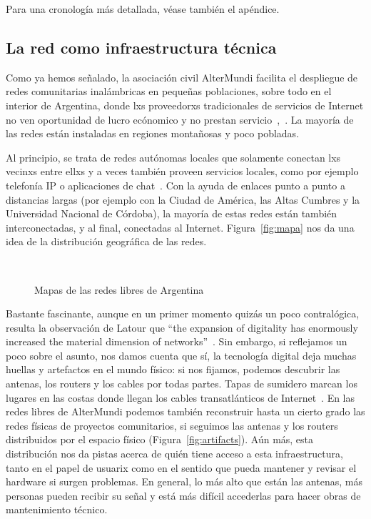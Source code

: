Para una cronología más detallada, véase también el apéndice.

\subsection{La red como infraestructura técnica}

Como ya hemos señalado, la asociación civil AlterMundi facilita el despliegue de redes comunitarias inalámbricas en pequeñas poblaciones, sobre todo en el interior de Argentina, donde lxs proveedorxs tradicionales de servicios de Internet no ven oportunidad de lucro ecónomico y no prestan servicio~\autocite{Piccoli2015},~\autocite{Vaseva2016a}.
La mayoría de las redes están instaladas en regiones montañosas y poco pobladas.

Al principio, se trata de redes autónomas locales que solamente conectan lxs vecinxs entre ellxs y a veces también proveen servicios locales, como por ejemplo telefonía IP o aplicaciones de chat~\autocite{Piccoli2015}.
Con la ayuda de enlaces punto a punto a distancias largas (por ejemplo con la Ciudad de América, las Altas Cumbres y la Universidad Nacional de Córdoba), la mayoría de estas redes están también interconectadas, y al final, conectadas al Internet.
Figura~\vref{fig:mapa} nos da una idea de la distribución geográfica de las redes.

\begin{figure}[h]
\centering
{} \\
\caption[mapas]{Mapas de las redes libres de Argentina} %
\label{fig:mapa}
\end{figure}

Bastante fascinante, aunque en un primer momento quizás un poco contralógica, resulta la observación de Latour que ``the expansion of digitality has enormously increased the material dimension of networks''~\autocite{Latour2010}.
Sin embargo, si reflejamos un poco sobre el asunto, nos damos cuenta que sí, la tecnología digital deja muchas huellas y artefactos en el mundo físico: si nos fijamos, podemos descubrir las antenas, los routers y los cables por todas partes.
Tapas de sumidero marcan los lugares en las costas donde llegan los cables transatlánticos de Internet~\autocite{Roth2015}.
En las redes libres de AlterMundi podemos también reconstruir hasta un cierto grado las redes físicas de proyectos comunitarios, si seguimos las antenas y los routers distribuidos por el espacio físico (Figura~\vref{fig:artifacts}).
Aún más, esta distribución nos da pistas acerca de quién tiene acceso a esta infraestructura, tanto en el papel de usuarix como en el sentido que pueda mantener y revisar el hardware si surgen problemas.
En general, lo más alto que están las antenas, más personas pueden recibir su señal y está más difícil accederlas para hacer obras de mantenimiento técnico.

